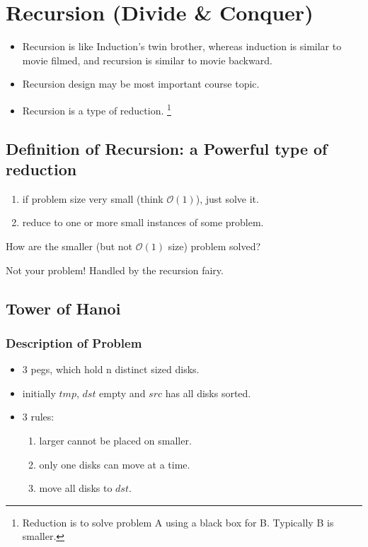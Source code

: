 \section{Recursion (Divide \& Conquer)}
\begin{itemize}
\item Recursion is like Induction's twin brother, whereas induction is similar to movie filmed, and recursion is similar to movie backward.
\item Recursion design may be most important course topic.
\item Recursion is a type of reduction. \footnote{Reduction is to solve problem A using a black box for B. Typically B is smaller.}
\end{itemize}

\subsection{Definition of Recursion: a Powerful type of reduction}
\begin{enumerate}
\item if problem size very small (think $\mathcal{O}(1)$), just solve it.
\item reduce to one or more small instances of some problem.
\end{enumerate}

\question How are the smaller (but not $\mathcal{O}(1)$ size) problem solved?

Not your problem! Handled by the recursion fairy.

\subsection{Tower of Hanoi}
\subsubsection{Description of Problem}
\begin{itemize}
    \item 3 pegs, which hold n distinct sized disks.
    \item initially $tmp$, $dst$ empty and $src$ has all disks sorted.
    \item 3 rules:
    \begin{enumerate}
        \item larger cannot be placed on smaller.
        \item only one disks can move at a time.
        \item move all disks to $dst$.
    \end{enumerate}
\end{itemize}

